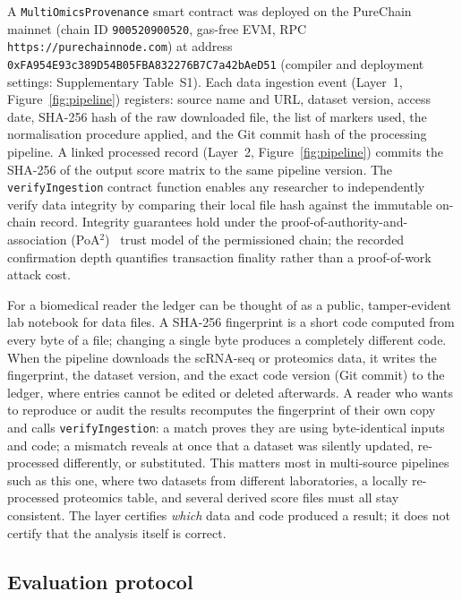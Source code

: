\documentclass[5p,times,twocolumn]{elsarticle}
\newcommand{\rtag}[1]{}
\newcommand{\rev}[2]{\rtag{#1}#2}
\newenvironment{revblock}[1]{\par\rtag{#1}\ignorespaces}{\par}
\begin{document}
A \texttt{MultiOmicsProvenance} smart contract was deployed
on the PureChain mainnet (chain ID \texttt{900520900520},
gas-free EVM, RPC \texttt{https://purechainnode.com}) at
address \texttt{0xFA954E93c389D54B05FBA832276B7C7a42bAeD51}\rev{R2.24}{
  (compiler and deployment settings: Supplementary Table~S1)}.
Each data ingestion event (Layer~1, Figure~\ref{fig:pipeline})
registers: source name and URL, dataset version, access date,
SHA-256 hash of the raw downloaded file, the list of markers
used, the normalisation procedure applied, and the Git commit
hash of the processing pipeline.
A linked processed record (Layer~2, Figure~\ref{fig:pipeline})
commits the SHA-256 of the output score matrix to the same
pipeline version.
The \texttt{verifyIngestion} contract function enables any
researcher to independently verify data integrity by
comparing their local file hash against the immutable
on-chain record.
Integrity guarantees hold under the proof-of-authority-and-association (PoA$^2$)~\cite{kanu2026offline} trust
model of the permissioned chain; the recorded confirmation
depth quantifies transaction finality rather than a
proof-of-work attack cost.

\begin{revblock}{R1.11,R2.16}
  For a biomedical reader the ledger can be thought of as a
  public, tamper-evident lab notebook for data files. A SHA-256
  fingerprint is a short code computed from every byte of a
  file; changing a single byte produces a completely different
  code. When the pipeline downloads the scRNA-seq or proteomics
  data, it writes the fingerprint, the dataset version, and the
  exact code version (Git commit) to the ledger, where entries
  cannot be edited or deleted afterwards. A reader who wants to
  reproduce or audit the results recomputes the fingerprint of
  their own copy and calls \texttt{verifyIngestion}: a match
  proves they are using byte-identical inputs and code; a
  mismatch reveals at once that a dataset was silently updated,
  re-processed differently, or substituted. This matters most in
  multi-source pipelines such as this one, where two datasets
  from different laboratories, a locally re-processed
  proteomics table, and several derived score files must all
  stay consistent. The layer certifies \textit{which} data and
  code produced a result; it does not certify that the analysis
  itself is correct.
\end{revblock}

\subsection{\textbf{Evaluation protocol}}
\label{sec:eval}
\end{document}
